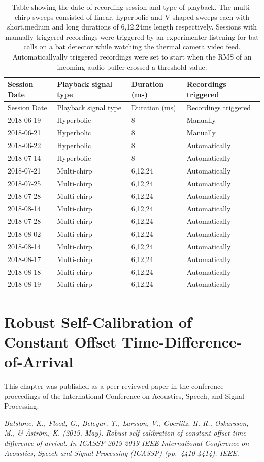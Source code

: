 \documentclass[
]{book}
\begin{document}
\begin{longtable}[]{@{}llll@{}}
\caption{\label{tab:nightandplayback} Table showing the date of recording session and type of playback. The multi-chirp sweeps consisted of linear, hyperbolic and V-shaped sweeps each with short,medium and long durations of 6,12,24ms length respectively. Sessions with manually triggered recordings were triggered by an experimenter listening for bat calls on a bat detector while watching the thermal camera video feed. Automaticallyally triggered recordings were set to start when the RMS of an incoming audio buffer crossed a threshold value.}\tabularnewline
\toprule
Session Date & Playback signal type & Duration (ms) & Recordings triggered\tabularnewline
\midrule
\endfirsthead
\toprule
Session Date & Playback signal type & Duration (ms) & Recordings triggered\tabularnewline
\midrule
\endhead
2018-06-19 & Hyperbolic & 8 & Manually\tabularnewline
2018-06-21 & Hyperbolic & 8 & Manually\tabularnewline
2018-06-22 & Hyperbolic & 8 & Automatically\tabularnewline
2018-07-14 & Hyperbolic & 8 & Automatically\tabularnewline
2018-07-21 & Multi-chirp & 6,12,24 & Automatically\tabularnewline
2018-07-25 & Multi-chirp & 6,12,24 & Automatically\tabularnewline
2018-07-28 & Multi-chirp & 6,12,24 & Automatically\tabularnewline
2018-08-14 & Multi-chirp & 6,12,24 & Automatically\tabularnewline
2018-07-28 & Multi-chirp & 6,12,24 & Automatically\tabularnewline
2018-08-02 & Multi-chirp & 6,12,24 & Automatically\tabularnewline
2018-08-14 & Multi-chirp & 6,12,24 & Automatically\tabularnewline
2018-08-17 & Multi-chirp & 6,12,24 & Automatically\tabularnewline
2018-08-18 & Multi-chirp & 6,12,24 & Automatically\tabularnewline
2018-08-19 & Multi-chirp & 6,12,24 & Automatically\tabularnewline
\bottomrule
\end{longtable}

\hypertarget{sfscotdoa}{%
\chapter{Robust Self-Calibration of Constant Offset Time-Difference-of-Arrival}\label{sfscotdoa}}


This chapter was published as a peer-reviewed paper in the conference proceedings of the International Conference on Acoustics, Speech, and Signal Processing:

\emph{Batstone, K., Flood, G., Beleyur, T., Larsson, V., Goerlitz, H. R., Oskarsson, M., \& Åström, K. (2019, May). Robust self-calibration of constant offset time-difference-of-arrival. In ICASSP 2019-2019 IEEE International Conference on Acoustics, Speech and Signal Processing (ICASSP) (pp.~4410-4414). IEEE.}
\end{document}
